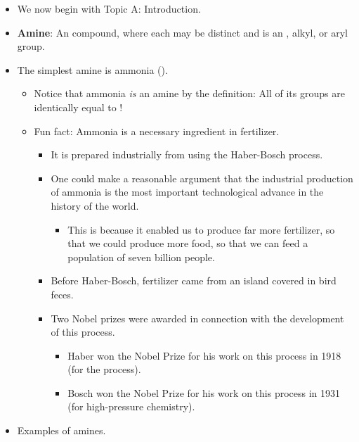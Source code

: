 \documentclass[../notes.tex]{subfiles}
\begin{document}
\begin{itemize}
    \item We now begin with Topic A: Introduction.
    \item \textbf{Amine}: An  compound, where each  may be distinct and  is an , alkyl, or aryl group.
    \item The simplest amine is ammonia ().
    \begin{itemize}
        \item Notice that ammonia \emph{is} an amine by the definition: All of its  groups are identically equal to !
        \item Fun fact: Ammonia is a necessary ingredient in fertilizer.
        \begin{itemize}
            \item It is prepared industrially from  using the Haber-Bosch process.
            \item One could make a reasonable argument that the industrial production of ammonia is the most important technological advance in the history of the world.
            \begin{itemize}
                \item This is because it enabled us to produce far more fertilizer, so that we could produce more food, so that we can feed a population of seven billion people.
            \end{itemize}
            \item Before Haber-Bosch, fertilizer came from an island covered in bird feces.
            \item Two Nobel prizes were awarded in connection with the development of this process.
            \begin{itemize}
                \item Haber won the Nobel Prize for his work on this process in 1918 (for the process).
                \item Bosch won the Nobel Prize for his work on this process in 1931 (for high-pressure chemistry).
            \end{itemize}
        \end{itemize}
    \end{itemize}
    \item Examples of amines.
    \begin{figure}[H]
        \centering
        \footnotesize
        \begin{subfigure}[b]{0.49\linewidth}
            \centering

\end{subfigure}
\end{figure}
\end{itemize}
\end{document}

